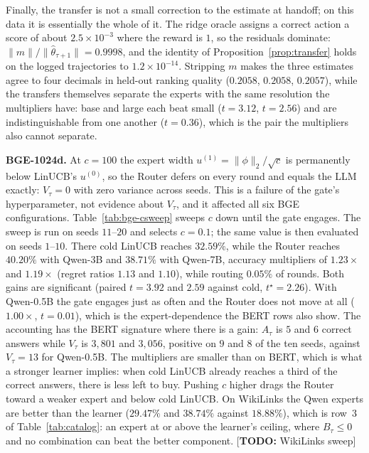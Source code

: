 \documentclass{article}
\theoremstyle{definition}
\theoremstyle{remark}
\theoremstyle{remark}
\newcommand{\todo}[1]{\textcolor{red!70!black}{[\textbf{TODO:} #1]}}
\begin{document}
Finally, the transfer is not a small correction to the estimate at handoff; on
this data it is essentially the whole of it. The ridge oracle assigns a
correct action a score of about $2.5\times10^{-3}$ where the reward is $1$, so
the residuals dominate: $\|m\|/\|\widehat\theta_{\tau+1}\|=0.9998$, and the
identity of Proposition~\ref{prop:transfer} holds on the logged trajectories
to $1.2\times10^{-14}$. Stripping $m$ makes the three estimates agree to four
decimals in held-out ranking quality ($0.2058$, $0.2058$, $0.2057$), while the
transfers themselves separate the experts with the same resolution the
multipliers have: base and large each beat small ($t=3.12$, $t=2.56$) and are
indistinguishable from one another ($t=0.36$), which is the pair the
multipliers also cannot separate.

\textbf{BGE-1024d.} At $c=100$ the expert width $u^{(1)}=\|\phi\|_2/\sqrt c$
is permanently below LinUCB's $u^{(0)}$, so the Router defers on every round
and equals the LLM exactly: $V_\tau=0$ with zero variance across seeds. This
is a failure of the gate's hyperparameter, not evidence about $V_\tau$, and it
affected all six BGE configurations. Table~\ref{tab:bge-csweep} sweeps $c$
down until the gate engages. The sweep is run on seeds $11$--$20$ and selects
$c=0.1$; the same value is then evaluated on seeds $1$--$10$. There cold LinUCB
reaches $32.59\%$, while the Router reaches $40.20\%$ with Qwen-3B and
$38.71\%$ with Qwen-7B, accuracy multipliers of $1.23\times$ and $1.19\times$
(regret ratios $1.13$ and $1.10$), while routing $0.05\%$ of rounds. Both gains
are significant (paired $t=3.92$ and $2.59$ against cold, $t^\star=2.26$). With
Qwen-0.5B the gate engages just as often and the Router does not move at all
($1.00\times$, $t=0.01$), which is the expert-dependence the BERT rows also
show. The accounting has the BERT signature where there is a gain: $A_\tau$ is
$5$ and $6$ correct answers while $V_\tau$ is $3{,}801$ and $3{,}056$, positive
on $9$ and $8$ of the ten seeds, against $V_\tau=13$ for Qwen-0.5B. The
multipliers are smaller than on BERT, which is what a stronger learner implies:
when cold LinUCB already reaches a third of the correct answers, there is less
left to buy. Pushing $c$ higher
drags the Router toward a weaker expert and below cold LinUCB. On WikiLinks
the Qwen experts are better than the learner ($29.47\%$ and $38.74\%$ against
$18.88\%$), which is row~3 of Table~\ref{tab:catalog}: an expert at or above the
learner's ceiling, where $B_\tau\le0$ and no combination can beat the better
component. \todo{WikiLinks sweep}
\end{document}
